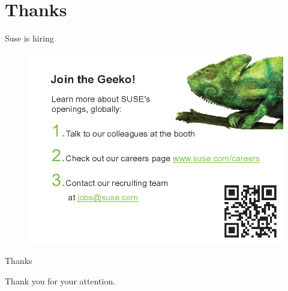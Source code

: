 \documentclass{beamer}
\begin{document}
\section{Thanks}

\begin{frame}{Suse is hiring}
	\begin{figure}
	\includegraphics[width= 0.8\linewidth]{suse_hiring.png}
	\end{figure}
\end{frame}

\begin{frame}{Thanks}
	\begin{center}
	Thank you for your attention.
	\end{center}
\end{frame}
\end{document}
